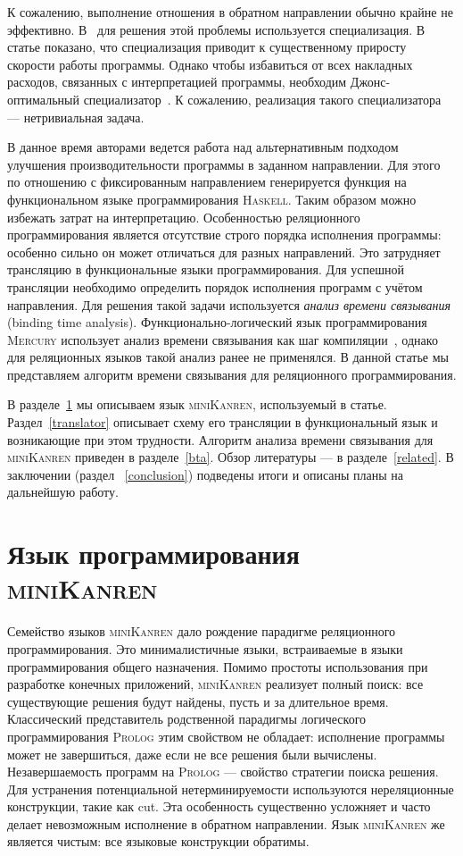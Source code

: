 \documentclass[conference,a4paper,american,russian]{IEEEtran}
\newcommand{\miniKanren}{\textsc{miniKanren}}
\newcommand{\mercury}{\textsc{Mercury}}
\newcommand{\haskell}{\textsc{Haskell}}
\newcommand{\prolog}{\textsc{Prolog}}
\begin{document}
К сожалению, выполнение отношения в обратном направлении обычно крайне не эффективно. 
В~\cite{lozov2019relational} для решения этой проблемы используется специализация. 
В статье показано, что специализация приводит к существенному приросту скорости работы программы.
Однако чтобы избавиться от всех накладных расходов, связанных с интерпретацией программы, необходим Джонс-оптимальный специализатор~\cite{jones1993partial}. 
К сожалению, реализация такого специализатора --- нетривиальная задача.

В данное время авторами ведется работа над альтернативным подходом улучшения производительности программы в заданном направлении. 
Для этого по отношению с фиксированным направлением генерируется функция на функциональном языке программирования \haskell{}. 
Таким образом можно избежать затрат на интерпретацию. 
Особенностью реляционного программирования является отсутствие строго порядка исполнения программы: особенно сильно он может отличаться для разных направлений.
Это затрудняет трансляцию в функциональные языки программирования. 
Для успешной трансляции необходимо определить порядок исполнения программ с учётом направления. 
Для решения такой задачи используется \textit{анализ времени связывания} (binding time analysis). 
Функционально-логический язык программирования \mercury{} использует анализ времени связывания как шаг компиляции~\cite{vanhoof2004binding}, однако для реляционных языков такой анализ ранее не применялся.
В данной статье мы представляем алгоритм времени связывания для реляционного программирования. 

В разделе~\ref{miniKanren} мы описываем язык \miniKanren{}, используемый в статье.
Раздел~\ref{translator} описывает схему его трансляции в функциональный язык и возникающие при этом трудности.
Алгоритм анализа времени связывания для \miniKanren{} приведен в разделе~\ref{bta}. 
Обзор литературы --- в разделе~\ref{related}.
В заключении (раздел ~\ref{conclusion}) подведены итоги и описаны планы на дальнейшую работу. 

\section{Язык программирования \miniKanren{}}\label{miniKanren}

Семейство языков \miniKanren{} дало рождение парадигме реляционного программирования. 
Это минималистичные языки, встраиваемые в языки программирования общего назначения. 
Помимо простоты использования при разработке конечных приложений, \miniKanren{} реализует полный поиск: все существующие решения будут найдены, пусть и за длительное время.
Классический представитель родственной парадигмы логического программирования \prolog{} этим свойством не обладает: исполнение программы может не завершиться, даже если не все решения были вычислены. 
Незавершаемость программ на \prolog{} --- свойство стратегии поиска решения.
Для устранения потенциальной нетерминируемости используются нереляционные конструкции, такие как cut. 
Эта особенность существенно усложняет и часто делает невозможным исполнение в обратном направлении. 
Язык \miniKanren{} же является чистым: все языковые конструкции обратимы. 
\end{document}
